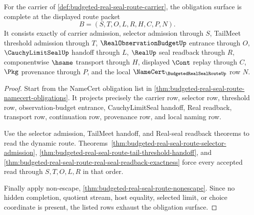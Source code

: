 \begin{theorem}
\label{thm:budgeted-real-seal-route-obligation-closure}
For the carrier of \autoref{def:budgeted-real-seal-route-carrier}, the obligation surface is complete at the displayed route packet
$$
B=(S,T,O,L,R,H,C,P,N).
$$
It consists exactly of carrier admission, selector admission through $S$, TailMeet threshold admission through $T$, $\RealObservationBudgetUp$ entrance through $O$, $\CauchyLimitSealUp$ handoff through $L$, $\RealUp$ seal readback through $R$, componentwise $\hsame$ transport through $H$, displayed $\Cont$ replay through $C$, $\Pkg$ provenance through $P$, and the local $\NameCert_{\BudgetedRealSealRouteUp}$ row $N$.
\end{theorem}
\begin{proof}
Start from the NameCert obligation list in \autoref{thm:budgeted-real-seal-route-namecert-obligations}. It projects precisely the carrier row, selector row, threshold row, observation-budget entrance, CauchyLimitSeal handoff, Real readback, transport row, continuation row, provenance row, and local naming row.

Use the selector admission, TailMeet handoff, and Real-seal readback theorems to read the dynamic route. Theorems~\ref{thm:budgeted-real-seal-route-selector-admission}, \ref{thm:budgeted-real-seal-route-tail-threshold-handoff}, and \ref{thm:budgeted-real-seal-route-real-seal-readback-exactness} force every accepted read through $S,T,O,L,R$ in that order.

Finally apply non-escape, \autoref{thm:budgeted-real-seal-route-nonescape}. Since no hidden completion, quotient stream, host equality, selected limit, or choice coordinate is present, the listed rows exhaust the obligation surface.
\end{proof}

